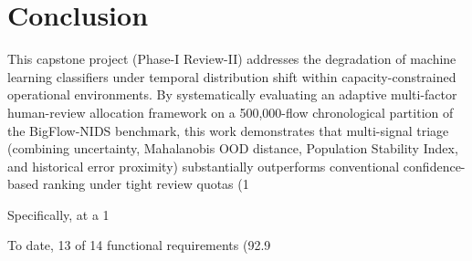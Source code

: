 \chapter{Conclusion}

This capstone project (Phase-I Review-II) addresses the degradation of machine learning classifiers under temporal distribution shift within capacity-constrained operational environments. By systematically evaluating an adaptive multi-factor human-review allocation framework on a 500,000-flow chronological partition of the BigFlow-NIDS benchmark, this work demonstrates that multi-signal triage (combining uncertainty, Mahalanobis OOD distance, Population Stability Index, and historical error proximity) substantially outperforms conventional confidence-based ranking under tight review quotas (1%

Specifically, at a 1%

To date, 13 of 14 functional requirements (92.9%
